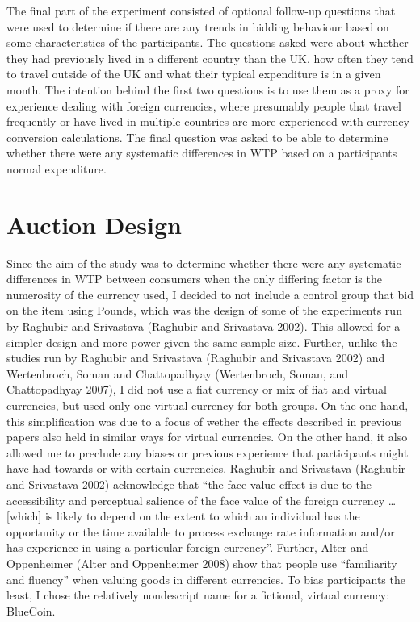 \documentclass[
]{report}
\begin{document}
The final part of the experiment consisted of optional follow-up
questions that were used to determine if there are any trends in bidding
behaviour based on some characteristics of the participants. The
questions asked were about whether they had previously lived in a
different country than the UK, how often they tend to travel outside of
the UK and what their typical expenditure is in a given month. The
intention behind the first two questions is to use them as a proxy for
experience dealing with foreign currencies, where presumably people that
travel frequently or have lived in multiple countries are more
experienced with currency conversion calculations. The final question
was asked to be able to determine whether there were any systematic
differences in WTP based on a participants normal expenditure.

\section{Auction Design}\label{auction-design}

Since the aim of the study was to determine whether there were any
systematic differences in WTP between consumers when the only differing
factor is the numerosity of the currency used, I decided to not include
a control group that bid on the item using Pounds, which was the design
of some of the experiments run by Raghubir and Srivastava (Raghubir and
Srivastava 2002). This allowed for a simpler design and more power given
the same sample size. Further, unlike the studies run by Raghubir and
Srivastava (Raghubir and Srivastava 2002) and Wertenbroch, Soman and
Chattopadhyay (Wertenbroch, Soman, and Chattopadhyay 2007), I did not
use a fiat currency or mix of fiat and virtual currencies, but used only
one virtual currency for both groups. On the one hand, this
simplification was due to a focus of wether the effects described in
previous papers also held in similar ways for virtual currencies. On the
other hand, it also allowed me to preclude any biases or previous
experience that participants might have had towards or with certain
currencies. Raghubir and Srivastava (Raghubir and Srivastava 2002)
acknowledge that ``the face value effect is due to the accessibility and
perceptual salience of the face value of the foreign currency \ldots{}
{[}which{]} is likely to depend on the extent to which an individual has
the opportunity or the time available to process exchange rate
information and/or has experience in using a particular foreign
currency''. Further, Alter and Oppenheimer (Alter and Oppenheimer 2008)
show that people use ``familiarity and fluency'' when valuing goods in
different currencies. To bias participants the least, I chose the
relatively nondescript name for a fictional, virtual currency: BlueCoin.
\end{document}
